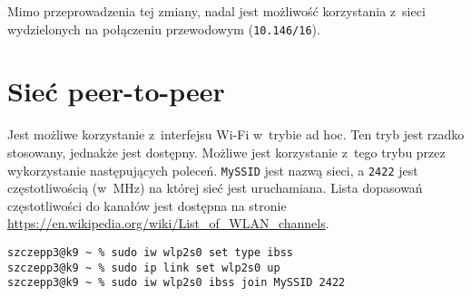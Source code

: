 \documentclass[a4paper,11pt]{article}
\begin{document}
Mimo przeprowadzenia tej zmiany, nadal jest możliwość korzystania z~sieci wydzielonych
na połączeniu przewodowym (\verb|10.146/16|).

\section{Sieć peer-to-peer}

Jest możliwe korzystanie z~interfejsu Wi-Fi w~trybie ad hoc. Ten tryb jest rzadko
stosowany, jednakże jest dostępny. Możliwe jest korzystanie z~tego trybu przez
wykorzystanie następujących poleceń. \verb|MySSID| jest nazwą sieci, a \verb|2422|
jest częstotliwością (w~MHz) na której sieć jest uruchamiana. Lista dopasowań
częstotliwości do kanałów jest dostępna na stronie
\url{https://en.wikipedia.org/wiki/List_of_WLAN_channels}.

\begin{verbatim}
szczepp3@k9 ~ % sudo iw wlp2s0 set type ibss
szczepp3@k9 ~ % sudo ip link set wlp2s0 up
szczepp3@k9 ~ % sudo iw wlp2s0 ibss join MySSID 2422
\end{verbatim}
\end{document}
